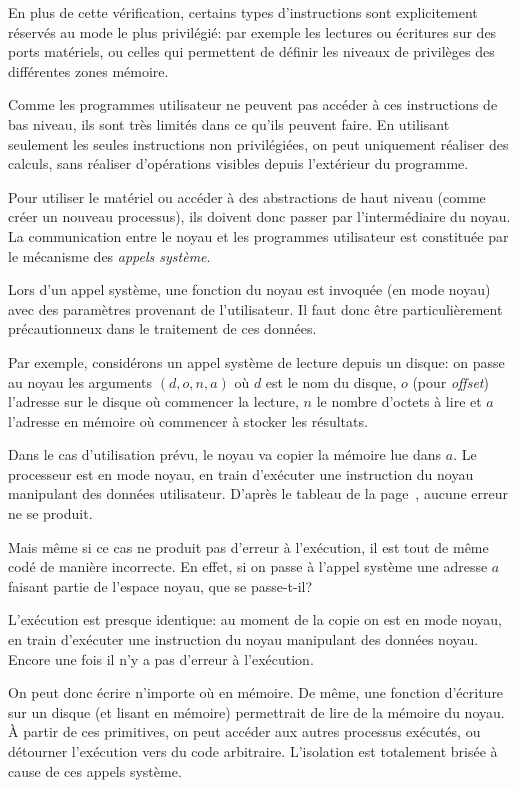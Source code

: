 En plus de cette vérification, certains types d'instructions sont explicitement
réservés au mode le plus privilégié: par exemple les lectures ou écritures sur
des ports matériels, ou celles qui permettent de définir les niveaux de
privilèges des différentes zones mémoire.

Comme les programmes utilisateur ne peuvent pas accéder à ces instructions de
bas niveau, ils sont très limités dans ce qu'ils peuvent faire. En utilisant
seulement les seules instructions non privilégiées, on peut uniquement réaliser
des calculs, sans réaliser d'opérations visibles depuis l'extérieur du
programme.

Pour utiliser le matériel ou accéder à des abstractions de haut niveau (comme
créer un nouveau processus), ils doivent donc passer par l'intermédiaire du
noyau. La communication entre le noyau et les programmes utilisateur est
constituée par le mécanisme des \emph{appels système}.

Lors d'un appel système, une fonction du noyau est invoquée (en mode noyau) avec
des paramètres provenant de l'utilisateur. Il faut donc être particulièrement
précautionneux dans le traitement de ces données.

Par exemple, considérons un appel système de lecture depuis un disque: on passe
au noyau les arguments $(d, o, n, a)$ où $d$ est le nom du disque, $o$ (pour
\emph{offset}) l'adresse sur le disque où commencer la lecture, $n$ le nombre
d'octets à lire et $a$ l'adresse en mémoire où commencer à stocker les
résultats.

Dans le cas d'utilisation prévu, le noyau va copier la mémoire lue dans $a$. Le
processeur est en mode noyau, en train d'exécuter une instruction du noyau
manipulant des données utilisateur. D'après le tableau de la
page~\pageref{page:erreursec}, aucune erreur ne se produit.

Mais même si ce cas ne produit pas d'erreur à l'exécution, il est tout de même
codé de manière incorrecte. En effet, si on passe à l'appel système une adresse
$a$ faisant partie de l'espace noyau, que se passe-t-il?

L'exécution est presque identique: au moment de la copie on est en mode noyau,
en train d'exécuter une instruction du noyau manipulant des données noyau.
Encore une fois il n'y a pas d'erreur à l'exécution.

On peut donc écrire n'importe où en mémoire. De même, une fonction d'écriture
sur un disque (et lisant en mémoire) permettrait de lire de la mémoire du noyau.
À partir de ces primitives, on peut accéder aux autres processus exécutés, ou
détourner l'exécution vers du code arbitraire. L'isolation est totalement
brisée à cause de ces appels système.

